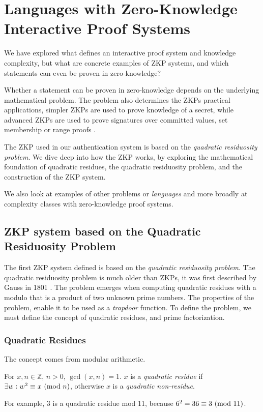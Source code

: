 \section{Languages with Zero-Knowledge Interactive Proof Systems}
We have explored what defines an interactive proof system and knowledge complexity, but what are concrete examples of ZKP systems, and which statements can even be proven in zero-knowledge?

Whether a statement can be proven in zero-knowledge depends on the underlying mathematical problem.
The problem also determines the ZKPs practical applications, simpler ZKPs are used to prove knowledge of a secret, while advanced ZKPs are used to prove signatures over committed values, set membership or range proofs \cite{camenisch2008efficient, bunz2018bulletproofs, camenisch2001efficient, bowe2018multi}.

The ZKP \cite{goldwasser1989knowledge} used in our authentication system is based on the \textit{quadratic residuosity problem}.
We dive deep into how the ZKP works, by exploring the mathematical foundation of quadratic residues, the quadratic residuosity problem, and the construction of the ZKP system.

We also look at examples of other problems or \textit{languages} and more broadly at complexity classes with zero-knowledge proof systems.

\subsection{ZKP system based on the Quadratic Residuosity Problem}
\label{zkp-qrp}
The first ZKP system defined \cite{goldwasser1989knowledge} is based on the \textit{quadratic residuosity problem}.
The quadratic residuosity problem is much older than ZKPs, it was first described by Gauss in 1801 \cite{gauss1801disquisitiones}.
The problem emerges when computing quadratic residues with a modulo that is a product of two unknown prime numbers.
The properties of the problem, enable it to be used as a \textit{trapdoor} function. 
To define the problem, we must define the concept of quadratic residues, and prime factorization.


\subsubsection{Quadratic Residues} 
The concept \cite{andrews1994number} comes from modular arithmetic.

\begin{definition}
	For $x, n \in \mathbb{Z}$, $n > 0$, $\gcd(x, n) = 1 $.
	$x$ is a \textit{quadratic residue} if  $\exists w:w^2 \equiv x \ (\mathrm{mod}\ n)$, otherwise $x$ is a \textit{quadratic non-residue}.
\end{definition}
\noindent For example,
$3$ is a quadratic residue mod 11, because $6^2 = 36 \equiv 3 \ (\mathrm{mod}\ 11)$.

